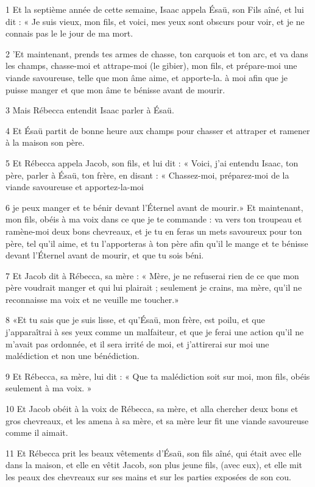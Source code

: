 \par 1 Et la septième année de cette semaine, Isaac appela Ésaü, son Fils aîné, et lui dit : « Je suis vieux, mon fils, et voici, mes yeux sont obscurs pour voir, et je ne connais pas le le jour de ma mort.
\par 2 'Et maintenant, prends tes armes de chasse, ton carquois et ton arc, et va dans les champs, chasse-moi et attrape-moi (le gibier), mon fils, et prépare-moi une viande savoureuse, telle que mon âme aime, et apporte-la. à moi afin que je puisse manger et que mon âme te bénisse avant de mourir.
\par 3 Mais Rébecca entendit Isaac parler à Ésaü.
\par 4 Et Ésaü partit de bonne heure aux champs pour chasser et attraper et ramener à la maison son père.
\par 5 Et Rébecca appela Jacob, son fils, et lui dit : « Voici, j'ai entendu Isaac, ton père, parler à Ésaü, ton frère, en disant : « Chassez-moi, préparez-moi de la viande savoureuse et apportez-la-moi
\par 6 je peux manger et te bénir devant l'Éternel avant de mourir.» Et maintenant, mon fils, obéis à ma voix dans ce que je te commande : va vers ton troupeau et ramène-moi deux bons chevreaux, et je tu en feras un mets savoureux pour ton père, tel qu'il aime, et tu l'apporteras à ton père afin qu'il le mange et te bénisse devant l'Éternel avant de mourir, et que tu sois béni.
\par 7 Et Jacob dit à Rébecca, sa mère : « Mère, je ne refuserai rien de ce que mon père voudrait manger et qui lui plairait ; seulement je crains, ma mère, qu'il ne reconnaisse ma voix et ne veuille me toucher.»
\par 8 «Et tu sais que je suis lisse, et qu'Ésaü, mon frère, est poilu, et que j'apparaîtrai à ses yeux comme un malfaiteur, et que je ferai une action qu'il ne m'avait pas ordonnée, et il sera irrité de moi, et j'attirerai sur moi une malédiction et non une bénédiction.
\par 9 Et Rébecca, sa mère, lui dit : « Que ta malédiction soit sur moi, mon fils, obéis seulement à ma voix. »
\par 10 Et Jacob obéit à la voix de Rébecca, sa mère, et alla chercher deux bons et gros chevreaux, et les amena à sa mère, et sa mère leur fit une viande savoureuse comme il aimait.
\par 11 Et Rébecca prit les beaux vêtements d'Ésaü, son fils aîné, qui était avec elle dans la maison, et elle en vêtit Jacob, son plus jeune fils, (avec eux), et elle mit les peaux des chevreaux sur ses mains et sur les parties exposées de son cou.
